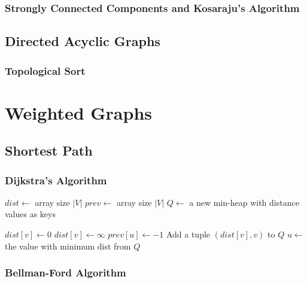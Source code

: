 \documentclass{report}
\begin{document}
\subsection{Strongly Connected Components and Kosaraju's Algorithm}

\section{Directed Acyclic Graphs}

\subsection{Topological Sort}


\chapter{Weighted Graphs}

\section{Shortest Path}

\subsection{Dijkstra's Algorithm}

\noindent \hrulefill
\begin{algorithmic}[1]
   
    \State $dist \gets$ array size $|V|$
    \State $prev \gets$ array size $|V|$
    \State $Q \gets$ a new min-heap with distance values as keys
    \item[]
        $dist[v] \gets 0$
      \EndIf
        $dist[v] \gets \infty$
      \EndIf
      \State $prev[u] \gets -1$
      \State Add a tuple $(dist[v], v)$ to $Q$
        \State $u \gets$ the value with minimum dist from $Q$ 
      \EndWhile
    \EndFor
  \EndFunction
\end{algorithmic}
\noindent \hrulefill

\subsection{Bellman-Ford Algorithm}
\end{document}
